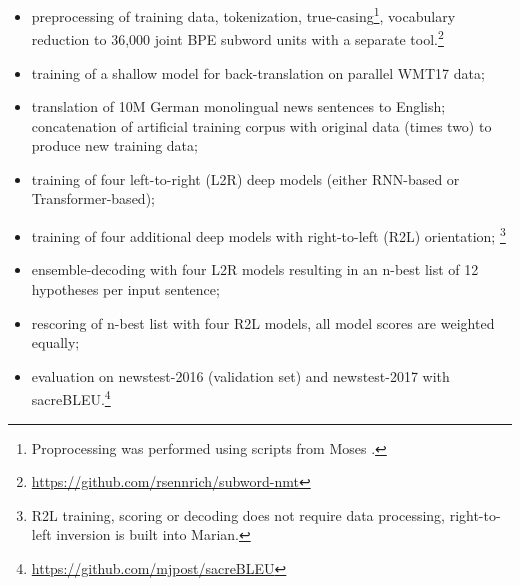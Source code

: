 \documentclass[11pt,a4paper]{article}
\begin{document}
  \begin{itemize}
  \item preprocessing of training data, tokenization, true-casing\footnote{Proprocessing was performed using scripts from Moses \cite{conf/acl/KoehnHBCFBCSMZDBCH07}.}, vocabulary reduction to 36,000 joint BPE subword units \cite{sennrich2016bpe} with a separate tool.\footnote{\url{https://github.com/rsennrich/subword-nmt}}
  \item training of a shallow model for back-translation on parallel WMT17 data;
  \item translation of 10M German monolingual news sentences to English; concatenation of artificial training corpus with original data (times two) to produce new training data;
  \item training of four left-to-right (L2R) deep models (either RNN-based or Transformer-based);
  \item training of four additional deep models with right-to-left (R2L) orientation; \footnote{R2L training, scoring or decoding does not require data processing, right-to-left inversion is built into Marian.}
  \item ensemble-decoding with four L2R models resulting in an n-best list of 12 hypotheses per input sentence;
  \item rescoring of n-best list with four R2L models, all model scores are weighted equally; 
  \item evaluation on newstest-2016 (validation set) and newstest-2017 with sacreBLEU.\footnote{\url{https://github.com/mjpost/sacreBLEU}}
  \end{itemize}
\end{document}

